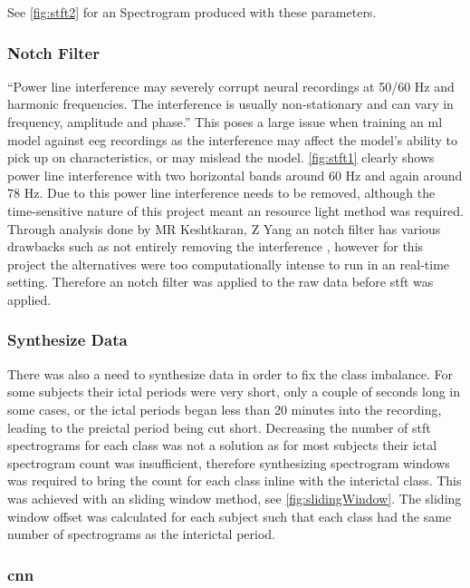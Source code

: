 \documentclass[12pt]{article}
\begin{document}
See \ref{fig:stft2} for an Spectrogram produced with these parameters. 

\subsubsection{Notch Filter}

``Power line interference may severely corrupt neural recordings at 50/60 Hz and harmonic frequencies. The interference is usually non-stationary and can vary in frequency, amplitude and phase.'' \cite{keshtkaran2014fast} This poses a large issue when training an \acrshort{ml} model against \acrshort{eeg} recordings as the interference may affect the model's ability to pick up on characteristics, or may mislead the model. \ref{fig:stft1} clearly shows power line interference with two horizontal bands around 60 Hz and again around 78 Hz. Due to this power line interference needs to be removed, although the time-sensitive nature of this project meant an resource light method was required. Through analysis done by MR Keshtkaran, Z Yang an notch filter has various drawbacks such as not entirely removing the interference \cite{keshtkaran2014fast}, however for this project the alternatives were too computationally intense to run in an real-time setting. Therefore an notch filter was applied to the raw data before \acrshort{stft} was applied. 


\subsubsection{Synthesize Data}

There was also a need to synthesize data in order to fix the class imbalance. For some subjects their ictal periods were very short, only a couple of seconds long in some cases, or the ictal periods began less than 20 minutes into the recording, leading to the preictal period being cut short. Decreasing the number of \acrshort{stft} spectrograms for each class was not a solution as for most subjects their ictal spectrogram count was insufficient, therefore synthesizing spectrogram windows was required to bring the count for each class inline with the interictal class. This was achieved with an sliding window method, see \ref{fig:slidingWindow}. The sliding window offset was calculated for each subject such that each class had the same number of spectrograms as the interictal period.

\subsubsection{\acrfull{cnn}}
\end{document}
